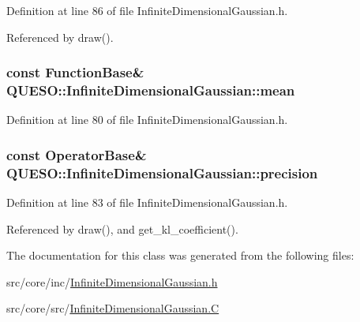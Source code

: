 Definition at line 86 of file Infinite\-Dimensional\-Gaussian.\-h.



Referenced by draw().

\hypertarget{class_q_u_e_s_o_1_1_infinite_dimensional_gaussian_a9d12c4e80eca7d797381c734d6d3476e}{
\subsubsection[{mean}]{\setlength{\rightskip}{0pt plus 5cm}const {\bf Function\-Base}\& Q\-U\-E\-S\-O\-::\-Infinite\-Dimensional\-Gaussian\-::mean\hspace{0.3cm}{\ttfamily [private]}}}\label{class_q_u_e_s_o_1_1_infinite_dimensional_gaussian_a9d12c4e80eca7d797381c734d6d3476e}


Definition at line 80 of file Infinite\-Dimensional\-Gaussian.\-h.

\hypertarget{class_q_u_e_s_o_1_1_infinite_dimensional_gaussian_af08c847ce01c948b60f72be309c60b37}{
\subsubsection[{precision}]{\setlength{\rightskip}{0pt plus 5cm}const {\bf Operator\-Base}\& Q\-U\-E\-S\-O\-::\-Infinite\-Dimensional\-Gaussian\-::precision\hspace{0.3cm}{\ttfamily [private]}}}\label{class_q_u_e_s_o_1_1_infinite_dimensional_gaussian_af08c847ce01c948b60f72be309c60b37}


Definition at line 83 of file Infinite\-Dimensional\-Gaussian.\-h.



Referenced by draw(), and get\-\_\-kl\-\_\-coefficient().



The documentation for this class was generated from the following files\-:\begin{DoxyCompactItemize}
\item 
src/core/inc/\hyperlink{_infinite_dimensional_gaussian_8h}{Infinite\-Dimensional\-Gaussian.\-h}\item 
src/core/src/\hyperlink{_infinite_dimensional_gaussian_8_c}{Infinite\-Dimensional\-Gaussian.\-C}\end{DoxyCompactItemize}
